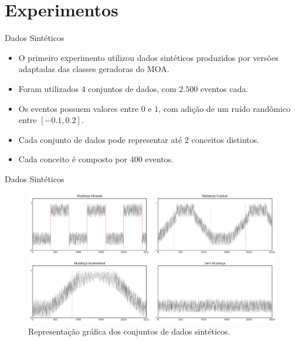 \documentclass[10pt]{beamer}
\begin{document}
\section{Experimentos}


\begin{frame}{Dados Sintéticos}
    \begin{itemize}
        \item O primeiro experimento utilizou dados sintéticos produzidos por versões adaptadas das classes geradoras do MOA.
        \item Foram utilizados $4$ conjuntos de dados, com $2.500$ eventos cada.
        \item Os eventos possuem valores entre $0$ e $1$, com adição de um ruído randômico entre $[-0.1, 0.2]$.
        \item Cada conjunto de dados pode representar até $2$ conceitos distintos.
        \item Cada conceito é composto por $400$ eventos.
    \end{itemize}
\end{frame}

\begin{frame}{Dados Sintéticos}
    \begin{figure}[ht]
        \begin{center}
            \includegraphics[width=\textwidth]{imagens/conjuntos_dados_sinteticos.png}
            \caption{Representação gráfica dos conjuntos de dados sintéticos.}
            \label{fig:conjuntos_dados_sinteticos}
        \end{center}
    \end{figure}
\end{frame}
\end{document}
